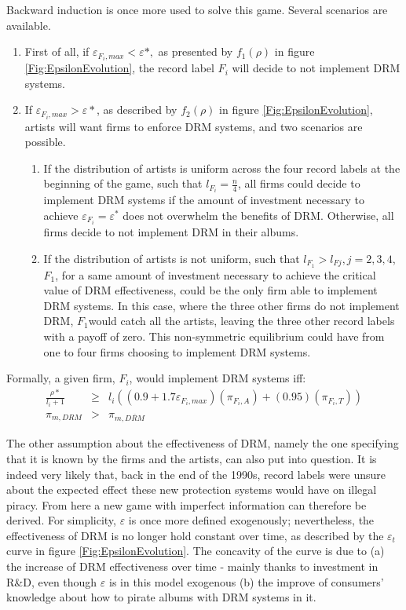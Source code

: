 \documentclass[a4paper,12pt]{article}
\numberwithin{equation}{section}
\begin{document}
Backward induction is once more used to solve this game. Several scenarios
are available. 
\begin{enumerate}
\item First of all, if $\varepsilon_{F_{i},max}<\varepsilon*,$ as presented
by $f_{1}(\rho)$ in figure \ref{Fig:EpsilonEvolution}, the record label $F_{i}$ will decide to not implement DRM systems.
\item If $\varepsilon_{F_{i},max}>\varepsilon*$, as described by $f_{2}(\rho)$
in figure \ref{Fig:EpsilonEvolution}, artists will want firms to enforce DRM systems, and two scenarios are possible.

\begin{enumerate}
\item If the distribution of artists is uniform across the four record labels
at the beginning of the game, such that $l_{F_{i}}=\frac{n}{4}$,
all firms could decide to implement DRM systems if the amount of investment
necessary to achieve $\varepsilon_{F_{i}}=\varepsilon^*$ does not overwhelm
the benefits of DRM. Otherwise, all firms decide to not implement
DRM in their albums. 
\item If the distribution of artists is not uniform, such that $l_{F_{1}}>l_{Fj},$$j=2,3,4$,$F_{1}$, for a same amount of investment necessary to achieve the critical
value of DRM effectiveness, could be the only firm able to implement
DRM systems. In this case, where the three other firms do not implement
DRM, $F_{1}$would catch all the artists, leaving the three other
record labels with a payoff of zero. This non-symmetric equilibrium
could have from one to four firms choosing to implement DRM systems. 
\end{enumerate}
\end{enumerate}

Formally, a given firm, $F_{i}$, would implement DRM systems iff:
\begin{eqnarray*}
\frac{\rho*}{l_{i}+1} & \geq & l_{i}((0.9+1.7\varepsilon_{F_{i},max})(\pi_{F_{i},A})+(0.95)(\pi_{F_{i},T}))\\
\pi_{m,DRM} & > & \pi_{m,\overline{DRM}}
\end{eqnarray*}

The other assumption about the effectiveness of DRM, namely the one
specifying that it is known by the firms and the artists, can also
put into question. It is indeed very likely that, back in the end
of the 1990s, record labels were unsure about the expected effect
these new protection systems would have on illegal piracy. From here
a new game with imperfect information can therefore be derived. For
simplicity, $\varepsilon$ is once more defined exogenously; nevertheless,
the effectiveness of DRM is no longer hold constant over time, as
described by the $\varepsilon_{t}$ curve in figure \ref{Fig:EpsilonEvolution}. The concavity
of the curve is due to (a) the increase of DRM effectiveness over
time - mainly thanks to investment in R\&D, even though $\varepsilon$
is in this model exogenous (b) the improve of consumers' knowledge
about how to pirate albums with DRM systems in it.\\
\end{document}
